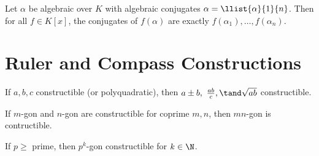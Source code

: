 \documentclass{article}
\begin{document}
\begin{ttheorem}
  Let \( \alpha \) be algebraic over \( K \) with algebraic conjugates \( \alpha=\llist{\alpha}{1}{n} \).
  Then for all \( f\in K[x] \), the conjugates of \( f(\alpha) \) are exactly \( f(\alpha_1),\ldots,f(\alpha_n) \).
\end{ttheorem}

\section{Ruler and Compass Constructions}


\begin{tlemma}
  If \( a,b,c \) constructible (or polyquadratic), then \( a\pm b,\ \frac{ab}{c},\tand \sqrt{ab} \) constructible.
\end{tlemma}

\begin{tfact}
If \( m \)-gon and \( n \)-gon are constructible for coprime \( m,n \), then \( mn \)-gon is contructible.
\end{tfact}

\begin{tfact}
  If \( p\geq \) prime, then \( p^k \)-gon constructible for \( k\in \N \).
\end{tfact}

\end{document}
